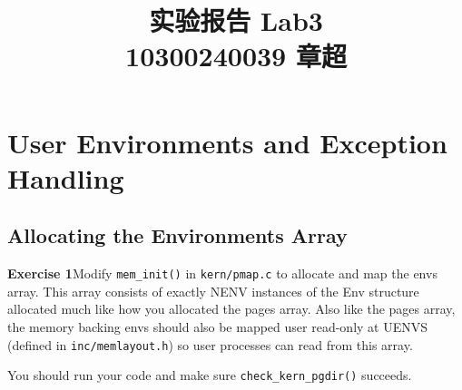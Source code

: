 \documentclass[11pt]{article}
\begin{document}
\title{\textbf{\huge{实验报告 Lab3}}\\
10300240039 章超}
\maketitle
\section{User Environments and Exception Handling}
\subsection{Allocating the Environments Array}
\begin{framed}
\noindent\textbf{Exercise 1}Modify \lstinline|mem_init()| in \lstinline|kern/pmap.c| to allocate and map the envs array. This array consists of exactly NENV instances of the Env structure allocated much like how you allocated the pages array. Also like the pages array, the memory backing envs should also be mapped user read-only at UENVS (defined in \lstinline|inc/memlayout.h|) so user processes can read from this array.

You should run your code and make sure \lstinline|check_kern_pgdir()| succeeds. 
\end{framed}
\end{document}
